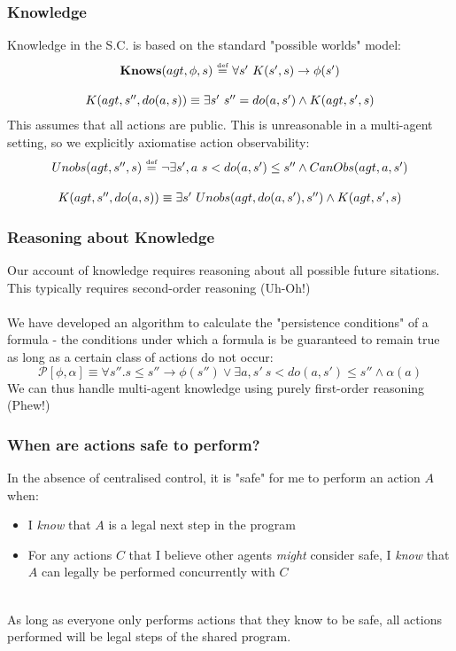 \documentclass{beamer}
\newcommand{\isdef}{\hbox{$\stackrel{\mbox{\tiny def}}{=}$}}
\begin{document}
\begin{frame}
\frametitle{Knowledge}
Knowledge in the S.C. is based on the standard "possible worlds" model:
\[
\begin{array}{c}
\mathbf{Knows}(agt,\phi,s)\ \isdef\ \forall s'\ K(s',s) \rightarrow \phi(s')\\
\\
K(agt,s'',do(a,s)) \equiv \exists s'\ s''=do(a,s') \wedge K(agt,s',s)
\end{array}
\]
\pause
This assumes that all actions are public.  This is unreasonable
in a multi-agent setting, so we explicitly axiomatise action observability:
\[
\begin{array}{c}
Unobs(agt,s'',s)\ \isdef\ \neg\exists s',a\ s<do(a,s')\leq s'' \wedge CanObs(agt,a,s')\\
\\
K(agt,s'',do(a,s)) \equiv \exists s'\ Unobs(agt,do(a,s'),s'') \wedge K(agt,s',s)
\end{array}
\]

\end{frame}

\begin{frame}
\frametitle{Reasoning about Knowledge}
Our account of knowledge requires reasoning about all possible future
sitations.  This typically requires second-order reasoning (Uh-Oh!)
\pause
\ \\
\ \\
We have developed an algorithm to calculate the "persistence conditions"
of a formula - the conditions under which a formula is be guaranteed to
remain true as long as a certain class of actions do not occur:
\[
\mathcal{P}[\phi,\alpha] \equiv \forall s'' . s \leq s'' \rightarrow \phi(s'') \vee \exists a,s'\ s<do(a,s')\leq s'' \wedge \alpha(a)
\]
\pause
We can thus handle multi-agent knowledge using purely first-order reasoning
(Phew!)
\end{frame}

\begin{frame}
\frametitle{When are actions safe to perform?}
In the absence of centralised control, it is "safe" for me to perform
an action $A$ when:
\begin{itemize}
  \item I \emph{know} that $A$ is a legal next step in the program
  \item For any actions $C$ that I believe other agents \emph{might} consider
safe, I \emph{know} that $A$ can legally be performed concurrently with $C$
\end{itemize}
\ \\
As long as everyone only performs actions that they know to be safe, all
actions performed will be legal steps of the shared program.
\end{frame}
\end{document}
